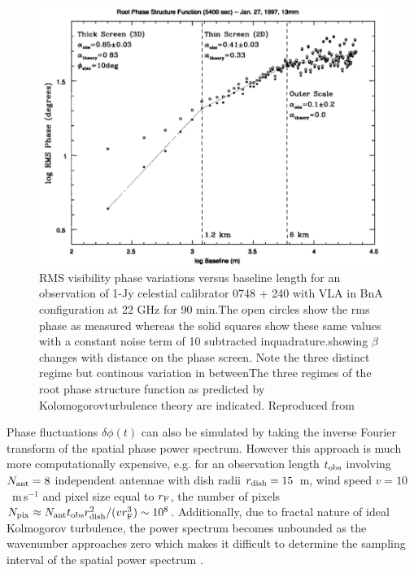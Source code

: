 \begin{figure}
\begin{center}
\includegraphics[width=\columnwidth]{Images/screentransition}
\caption{RMS visibility phase variations versus baseline length for an observation of  1-Jy celestial calibrator 0748 + 240 with VLA in BnA configuration at 22 GHz for 90 min.The open circles show the rms phase as measured whereas the solid squares show these same values with a constant noise term of 10 subtracted inquadrature.showing $\beta$ changes with distance on the phase screen. Note the three distinct regime but continous variation in betweenThe three regimes of the root phase structure function as predicted by Kolomogorovturbulence theory are indicated. Reproduced from \citet{carilli_1997} \label{fig:screentransition}
}
\end{center}
\end{figure}


Phase fluctuations $\delta\phi(t)$ can also be simulated by taking the inverse Fourier transform of the spatial phase power spectrum. However this approach is much more computationally expensive, e.g. for an observation length $t_{\rm obs}$ involving $N_{\rm ant}=8$ independent antennae with dish radii $r_{\rm dish}=15$~m, wind speed $v=10$~m\,s$^{-1}$ and pixel size equal to $r_{\rm F}$, the number of pixels $N_{\rm pix} \approx N_{\rm ant} t_{\rm obs} r_{\rm dish}^2/(v r_{\rm F}^3)  \sim 10^8$. Additionally, due to fractal nature of ideal Kolmogorov turbulence, the power spectrum becomes unbounded as the wavenumber approaches zero which makes it difficult to determine the sampling interval of the spatial power spectrum \citep{Lane_1992}. 


